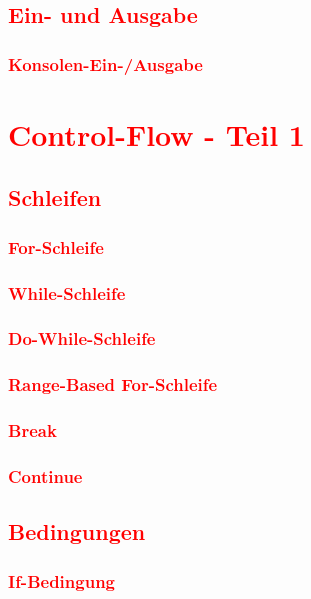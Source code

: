 \section{\textcolor{red}{Ein- und Ausgabe}}\label{sec:input-output}
\subsection{\textcolor{red}{Konsolen-Ein-/Ausgabe}}\label{sec:console-io}

\chapter{\textcolor{red}{Control-Flow - Teil 1}}\label{chap:control-flow-1}
\section{\textcolor{red}{Schleifen}}\label{sec:loops}
\subsection{\textcolor{red}{For-Schleife}}\label{sec:for-loop}
\subsection{\textcolor{red}{While-Schleife}}\label{sec:while-loop}
\subsection{\textcolor{red}{Do-While-Schleife}}\label{sec:do-while-loop}
\subsection{\textcolor{red}{Range-Based For-Schleife}}\label{sec:range-based-for-loop}
\subsection{\textcolor{red}{Break}}\label{sec:break}
\subsection{\textcolor{red}{Continue}}\label{sec:continue}
\section{\textcolor{red}{Bedingungen}}\label{sec:conditions}
\subsection{\textcolor{red}{If-Bedingung}}\label{sec:if-condition}
